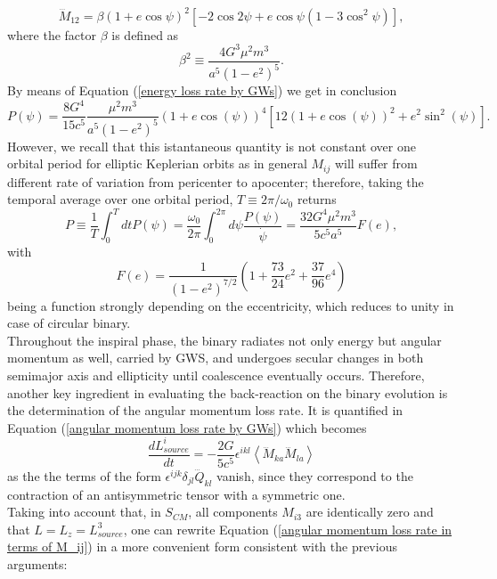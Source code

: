 \begin{equation}
    \dddot{M}_{12} = \beta (1 + e \cos \psi)^2 \left[ -2 \cos 2\psi + e \cos \psi (1 - 3 \cos^2 \psi) \right],
\end{equation}
where the factor $\beta$ is defined as
\begin{equation}
\beta^2 \equiv \frac{4 G^3 \mu^2 m^3}{a^5 (1 - e^2)^5}. 
\end{equation}
By means of Equation (\ref{energy loss rate by GWs}) we get in conclusion
\begin{equation}
    P(\psi)=\frac{8G^4}{15c^5}\frac{\mu^2m^3}{a^5(1-e^2)^5}(1+e\cos(\psi))^4[12(1+e\cos(\psi))^2+e^2\sin^2(\psi)].
\end{equation}
However, we recall that this istantaneous quantity is not constant over one orbital period for elliptic Keplerian orbits as in general $M_{ij}$ will suffer from different rate of variation from pericenter to apocenter; therefore, taking the temporal average over one orbital period, $T\equiv2\pi/\omega_0$ returns
\begin{equation}\label{P of GWs binary}
    P\equiv\frac{1}{T}\int_0^T dtP(\psi)=\frac{\omega_0}{2\pi}\int_0^{2\pi} d\psi \frac{P(\psi)}{\dot{\psi}}=\frac{32G^4\mu^2m^3}{5c^5a^5}F(e),
\end{equation}
with 
\begin{equation}\label{F(e) definition}
    F(e)=\frac{1}{(1-e^2)^{7/2}}\left(1+\frac{73}{24}e^2+\frac{37}{96}e^4\right)
\end{equation}
being a function strongly depending on the eccentricity, which reduces to unity in case of circular binary.\\Throughout the inspiral phase, the binary radiates not only energy but angular momentum as well, carried by GWS, and undergoes secular changes in both semimajor axis and ellipticity until coalescence eventually occurs. Therefore, another key ingredient in evaluating the back-reaction on the binary evolution is the determination of the angular momentum loss rate. It is quantified in Equation (\ref{angular momentum loss rate by GWs}) which becomes
\begin{equation}\label{angular momentum loss rate in terms of M_ij}
    \frac{dL^i_{source}}{dt}=-\frac{2G}{5c^5}\epsilon^{ikl}\left<\dddot{M}_{ka}\dddot{M}_{la}\right>
\end{equation}
as the the terms of the form $\epsilon^{ijk}\delta_{jl}\dddot{Q}_{kl}$ vanish, since they correspond to the contraction of an antisymmetric tensor with a symmetric one.\\Taking into account that, in $S_{CM}$, all components $M_{i3}$ are identically zero and that $L=L_z=L^3_{source}$, one can rewrite Equation (\ref{angular momentum loss rate in terms of M_ij}) in a more convenient form consistent with the previous arguments:
